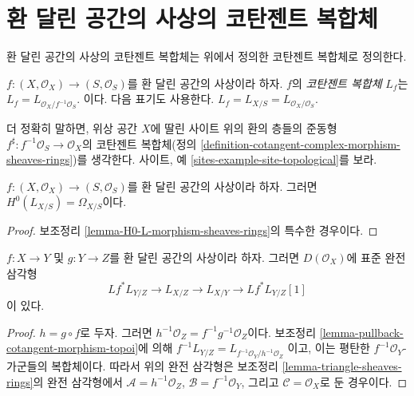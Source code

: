 \section{환 달린 공간의 사상의 코탄젠트 복합체}
\label{section-cotangent-morphism-ringed-spaces}

\noindent
환 달린 공간의 사상의 코탄젠트 복합체는 위에서 정의한 코탄젠트 복합체로
정의한다.

\begin{definition}
\label{definition-cotangent-complex-morphism-ringed-spaces}
$f : (X, \mathcal{O}_X) \to (S, \mathcal{O}_S)$를 환 달린 공간의 사상이라
하자. $f$의 {\it 코탄젠트 복합체} $L_f$는
$L_f = L_{\mathcal{O}_X/f^{-1}\mathcal{O}_S}$.
이다. 다음 표기도 사용한다.
$L_f = L_{X/S} = L_{\mathcal{O}_X/\mathcal{O}_S}$.
\end{definition}

\noindent
더 정확히 말하면, 위상 공간 $X$에 딸린 사이트 위의 환의 층들의 준동형
$f^\sharp : f^{-1}\mathcal{O}_S \to \mathcal{O}_X$의 코탄젠트 복합체(정의
\ref{definition-cotangent-complex-morphism-sheaves-rings})를 생각한다. 사이트,
예 \ref{sites-example-site-topological}를 보라.

\begin{lemma}
\label{lemma-H0-L-morphism-ringed-spaces}
$f : (X, \mathcal{O}_X) \to (S, \mathcal{O}_S)$를 환 달린 공간의 사상이라
하자. 그러면 $H^0(L_{X/S}) = \Omega_{X/S}$이다.
\end{lemma}

\begin{proof}
보조정리 \ref{lemma-H0-L-morphism-sheaves-rings}의 특수한 경우이다.
\end{proof}

\begin{lemma}
\label{lemma-triangle-ringed-spaces}
$f : X \to Y$ 및 $g : Y \to Z$를 환 달린 공간의 사상이라 하자. 그러면
$D(\mathcal{O}_X)$에 표준 완전 삼각형
$$
Lf^* L_{Y/Z} \to L_{X/Z} \to L_{X/Y} \to Lf^*L_{Y/Z}[1]
$$
이 있다.
\end{lemma}

\begin{proof}
$h = g \circ f$로 두자. 그러면
$h^{-1}\mathcal{O}_Z = f^{-1}g^{-1}\mathcal{O}_Z$이다. 보조정리
\ref{lemma-pullback-cotangent-morphism-topoi}에 의해
$f^{-1}L_{Y/Z} = L_{f^{-1}\mathcal{O}_Y/h^{-1}\mathcal{O}_Z}$
이고, 이는 평탄한 $f^{-1}\mathcal{O}_Y$-가군들의 복합체이다. 따라서 위의
완전 삼각형은 보조정리 \ref{lemma-triangle-sheaves-rings}의 완전 삼각형에서
$\mathcal{A} = h^{-1}\mathcal{O}_Z$, $\mathcal{B} = f^{-1}\mathcal{O}_Y$,
그리고 $\mathcal{C} = \mathcal{O}_X$로 둔 경우이다.
\end{proof}

